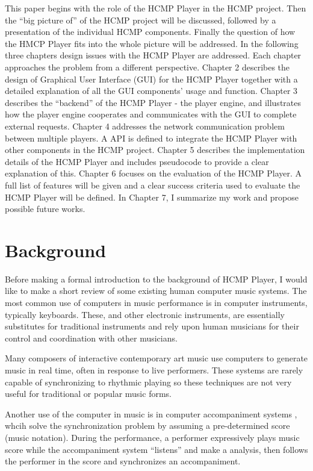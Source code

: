 This paper begins with the role of the HCMP Player in the HCMP project. Then
the ``big picture of'' of the HCMP project will be discussed, followed by a
presentation of the individual HCMP components. Finally the question of how
the HMCP Player fits into the whole picture will be addressed. In the
following three chapters design issues with the HCMP Player are addressed.
Each chapter approaches the problem from a different perspective. Chapter 2
describes the design of Graphical User Interface (GUI) for the HCMP Player together
with a detailed explanation of all the GUI components' usage and function.
Chapter 3 describes the ``backend'' of the HCMP Player - the player engine,
and illustrates how the player engine cooperates and communicates with the
GUI to complete external requests. Chapter 4 addresses the network
communication problem between multiple players. A API is
defined to integrate the HCMP Player with other components in the HCMP
project.  Chapter 5 describes the implementation details of the HCMP Player
and includes pseudocode to provide a clear explanation of this. Chapter 6
focuses on the evaluation of the HCMP Player. A full list of features
will be given and a clear success criteria used to evaluate the HCMP Player
will be defined. In Chapter 7, I summarize my work and propose possible
future works.

\section{Background}

Before making a formal introduction to the background of HCMP Player, 
I would like to make a short review of  
some existing human computer music systems. The most common use of 
computers in
music performance is in computer instruments, typically keyboards.
These, and other electronic instruments, are essentially substitutes 
for traditional
instruments and rely upon human musicians for their control and 
coordination with other musicians. 

Many composers of interactive contemporary art music use computers
to generate music in real time, often in response to live performers.
These systems are rarely capable of synchronizing to rhythmic playing
so these techniques are not very useful for traditional or popular music 
forms.

Another use of the computer in music is in computer accompaniment systems 
\cite{Roger:89}, 
whcih solve the synchronization problem by assuming a pre-determined 
score (music notation). During the performance, a performer expressively 
plays music score while the accompaniment system ``listens'' and make a analysis, 
then follows the performer 
in the score and synchronizes an accompaniment.

